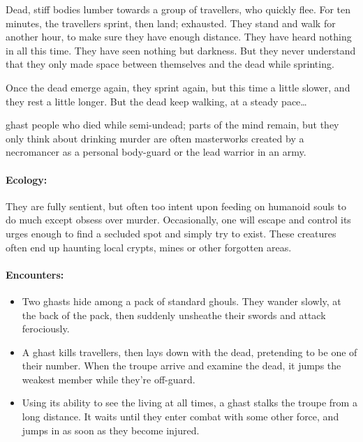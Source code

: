 \begin{multicols}{2}
\begin{exampletext}
  Dead, stiff bodies lumber towards a group of travellers, who quickly flee.
  For ten minutes, the travellers sprint, then land; exhausted.
  They stand and walk for another hour, to make sure they have enough distance.
  They have heard nothing in all this time.
  They have seen nothing but darkness.
  But they never understand that they only made space between themselves and the dead while sprinting.

  Once the dead emerge again, they sprint again, but this time a little slower, and they rest a little longer.
  But the dead keep walking, at a steady pace\ldots
\end{exampletext}

  {ghast}%
  {people who died while semi-undead; parts of the mind remain, but they only think about drinking murder}%
are often masterworks created by a necromancer as a personal body-guard or the lead warrior in an army.

\paragraph{Ecology:} They are fully sentient, but often too intent upon feeding on humanoid souls to do much except obsess over murder.
Occasionally, one will escape and control its urges enough to find a secluded spot and simply try to exist.
These creatures often end up haunting local crypts, mines or other forgotten areas.

\paragraph{Encounters:}

\begin{itemize}

  \item
  Two ghasts hide among a pack of standard ghouls.
  They wander slowly, at the back of the pack, then suddenly unsheathe their swords and attack ferociously.
  \item
  A ghast kills travellers, then lays down with the dead, pretending to be one of their number.
  When the troupe arrive and examine the dead, it jumps the weakest member while they're off-guard.
  \item
  Using its ability to see the living at all times, a ghast stalks the troupe from a long distance.
  It waits until they enter combat with some other force, and jumps in as soon as they become injured.


\end{itemize}
\end{multicols}
